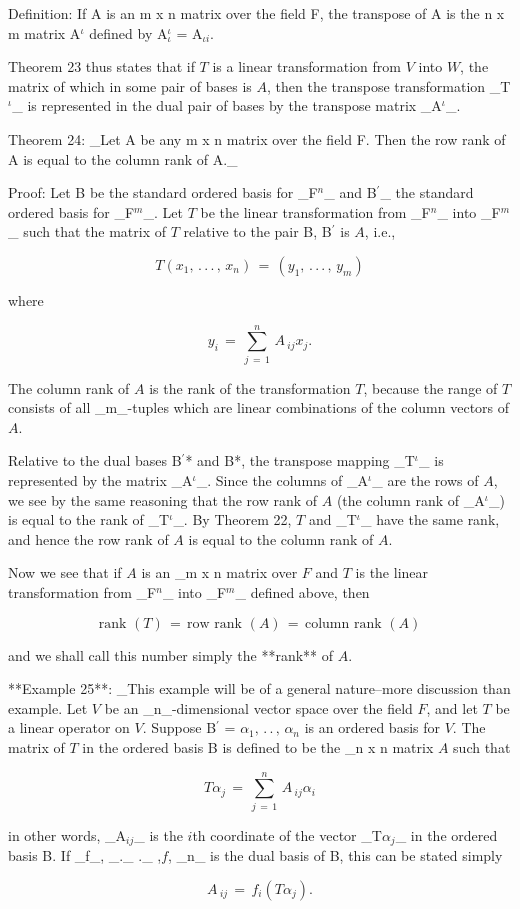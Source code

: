 Definition: If A is an m x n matrix over the field F, the transpose of A is the n x m matrix A\({}^{\iota}\) defined by A\({}^{\iota}_{\iota}\) = A\({}_{\iota i}\).

Theorem 23 thus states that if \(T\) is a linear transformation from \(V\) into \(W\), the matrix of which in some pair of bases is \(A\), then the transpose transformation _T\({}^{\iota}\)_ is represented in the dual pair of bases by the transpose matrix _A\({}^{\iota}\)_.

Theorem 24: _Let A be any m x n matrix over the field F. Then the row rank of A is equal to the column rank of A._

Proof: Let B be the standard ordered basis for _F\({}^{n}\)_ and B\({}^{\prime}\)_ the standard ordered basis for _F\({}^{m}\)_. Let \(T\) be the linear transformation from _F\({}^{n}\)_ into _F\({}^{m}\)_ such that the matrix of \(T\) relative to the pair B, B\({}^{\prime}\) is \(A\), i.e.,

\[T(x_{1},\,.\,.\,.\,,\,x_{n})\,=\,(y_{1},\,.\,.\,.\,,\,y_{m})\]

where

\[y_{i}\,=\,\sum\limits_{j\,=\,1}^{n}\,A\,_{ij}x_{j}.\]

The column rank of \(A\) is the rank of the transformation \(T\), because the range of \(T\) consists of all _m_-tuples which are linear combinations of the column vectors of \(A\).

Relative to the dual bases B\({}^{\prime}\)* and B*, the transpose mapping _T\({}^{\iota}\)_ is represented by the matrix _A\({}^{\iota}\)_. Since the columns of _A\({}^{\iota}\)_ are the rows of \(A\), we see by the same reasoning that the row rank of \(A\) (the column rank of _A\({}^{\iota}\)_) is equal to the rank of _T\({}^{\iota}\)_. By Theorem 22, \(T\) and _T\({}^{\iota}\)_ have the same rank, and hence the row rank of \(A\) is equal to the column rank of \(A\).

Now we see that if \(A\) is an _m x n matrix over \(F\) and \(T\) is the linear transformation from _F\({}^{n}\)_ into _F\({}^{m}\)_ defined above, then

\[\text{rank }(T)\,=\,\text{row rank }(A)\,=\,\text{column rank }(A)\]

and we shall call this number simply the **rank** of \(A\).

**Example 25**: _This example will be of a general nature--more discussion than example. Let \(V\) be an _n_-dimensional vector space over the field \(F\), and let \(T\) be a linear operator on \(V\). Suppose B\({}^{\prime}\) = {\(\alpha_{1},\,.\,.\,,\,\alpha_{n}\)} is an ordered basis for \(V\). The matrix of \(T\) in the ordered basis B is defined to be the _n x n matrix \(A\) such that

\[T\alpha_{j}\,=\,\sum\limits_{j\,=\,1}^{n}\,A\,_{ij}\alpha_{i}\]

in other words, _A\({}_{ij}\)_ is the \(i\)th coordinate of the vector _T\(\alpha_{j}\)_ in the ordered basis B. If {_f_, _._ ._ ,\(f\), _n_} is the dual basis of B, this can be stated simply

\[A\,_{ij}\,=\,f_{i}(T\alpha_{j}).\] 